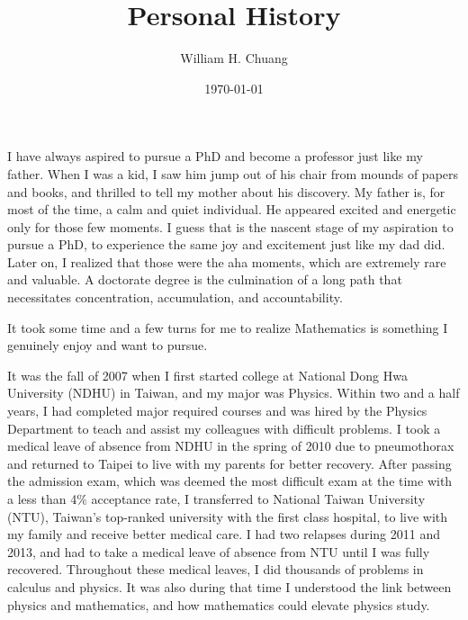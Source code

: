 \documentclass[11pt]{amsart}
\begin{document}
\title{Personal History}
\author{William H. Chuang}
\date{\today}
\maketitle



I have always aspired to pursue a PhD and become a professor just like my father. When I was a kid, I saw him jump out of his chair from mounds of papers and books, and thrilled to tell my mother about his discovery. My father is, for most of the time, a calm and quiet individual. He appeared excited and energetic only for those few moments. I guess that is the nascent stage of my aspiration to pursue a PhD, to experience the same joy and excitement just like my dad did. Later on, I realized that those were the aha moments, which are extremely rare and valuable. A doctorate degree is the culmination of a long path that necessitates concentration, accumulation, and accountability. %



It took some time and a few turns for me to realize Mathematics is something I genuinely enjoy and want to pursue. 

It was the fall of 2007 when I first started college at National Dong Hwa University (NDHU) in Taiwan, and my major was Physics. Within two and a half years, I had completed major required courses and was hired by the Physics Department to teach and assist my colleagues with difficult problems. I took a medical leave of absence from NDHU in the spring of 2010 due to pneumothorax and returned to Taipei to live with my parents for better recovery. After passing the admission exam, which was deemed the most difficult exam at the time with a less than 4$\%$ acceptance rate, I transferred to National Taiwan University (NTU), Taiwan's top-ranked university with the first class hospital, to live with my family and receive better medical care. I had two relapses during 2011 and 2013, and had to take a medical leave of absence from NTU until I was fully recovered. Throughout these medical leaves, I did thousands of problems in calculus and physics. It was also during that time I understood the link between physics and mathematics, and how mathematics could elevate physics study.
\end{document}
